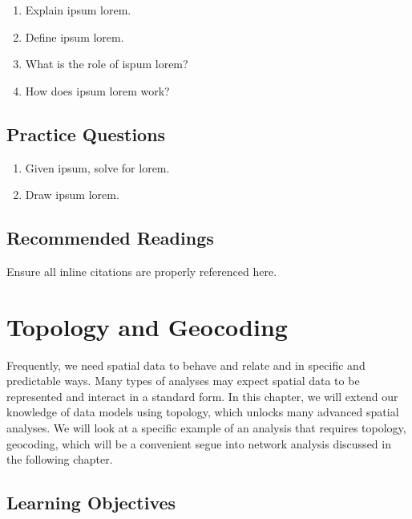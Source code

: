 \documentclass[
]{book}
\providecommand{\tightlist}{%
  \setlength{\itemsep}{0pt}\setlength{\parskip}{0pt}}
\begin{document}
\begin{enumerate}
\def\labelenumi{\arabic{enumi}.}
\tightlist
\item
  Explain ipsum lorem.
\item
  Define ipsum lorem.
\item
  What is the role of ispum lorem?
\item
  How does ipsum lorem work?
\end{enumerate}

\hypertarget{practice-questions-4}{%
\section*{Practice Questions}\label{practice-questions-4}}

\begin{enumerate}
\def\labelenumi{\arabic{enumi}.}
\setcounter{enumi}{1}
\tightlist
\item
  Given ipsum, solve for lorem.
\item
  Draw ipsum lorem.
\end{enumerate}

\hypertarget{recommended-readings-2}{%
\section*{Recommended Readings}\label{recommended-readings-2}}

Ensure all inline citations are properly referenced here.

\hypertarget{topology-and-geocoding}{%
\chapter{Topology and Geocoding}\label{topology-and-geocoding}}

Frequently, we need spatial data to behave and relate and in specific and predictable ways. Many types of analyses may expect spatial data to be represented and interact in a standard form. In this chapter, we will extend our knowledge of data models using topology, which unlocks many advanced spatial analyses. We will look at a specific example of an analysis that requires topology, geocoding, which will be a convenient segue into network analysis discussed in the following chapter.

\hypertarget{learning-objectives-6}{%
\section*{Learning Objectives}\label{learning-objectives-6}}
\end{document}
